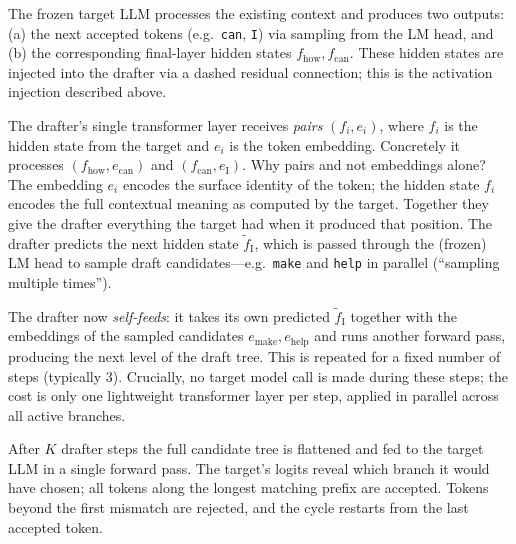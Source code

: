 \documentclass[11pt,a4paper]{article}
\theoremstyle{definition}
\theoremstyle{remark}
\theoremstyle{plain}
\begin{document}
\begin{description}[leftmargin=1.5em, style=nextline]
  \item[Step 1 --- Target forward pass.] The frozen target LLM processes
    the existing context and produces two outputs: (a) the next accepted
    tokens (e.g.\ \texttt{can}, \texttt{I}) via sampling from the LM head,
    and (b) the corresponding final-layer hidden states
    $f_{\text{how}}, f_{\text{can}}$. These hidden states are injected
    into the drafter via a dashed residual connection; this is the
    activation injection described above.
  \item[Step 2 --- Drafter forward pass 1.] The drafter's single
    transformer layer receives \emph{pairs} $(f_i, e_i)$, where $f_i$ is
    the hidden state from the target and $e_i$ is the token embedding.
    Concretely it processes $(f_{\text{how}}, e_{\text{can}})$ and
    $(f_{\text{can}}, e_{\text{I}})$. Why pairs and not embeddings alone?
    The embedding $e_i$ encodes the surface identity of the token; the
    hidden state $f_i$ encodes the full contextual meaning as computed by
    the target. Together they give the drafter everything the target had
    when it produced that position. The drafter predicts the next hidden
    state $\tilde{f}_{\text{I}}$, which is passed through the (frozen) LM
    head to sample draft candidates---e.g.\ \texttt{make} and \texttt{help}
    in parallel (``sampling multiple times'').
  \item[Step 3 --- Drafter forward passes 2, 3, \ldots] The drafter now
    \emph{self-feeds}: it takes its own predicted $\tilde{f}_{\text{I}}$
    together with the embeddings of the sampled candidates
    $e_{\text{make}}, e_{\text{help}}$ and runs another forward pass,
    producing the next level of the draft tree. This is repeated for a
    fixed number of steps (typically 3). Crucially, no target model call
    is made during these steps; the cost is only one lightweight
    transformer layer per step, applied in parallel across all active
    branches.
  \item[Step 4 --- Target verification.] After $K$ drafter steps the full
    candidate tree is flattened and fed to the target LLM in a single
    forward pass. The target's logits reveal which branch it would have
    chosen; all tokens along the longest matching prefix are accepted.
    Tokens beyond the first mismatch are rejected, and the cycle restarts
    from the last accepted token.
\end{description}
\end{document}
